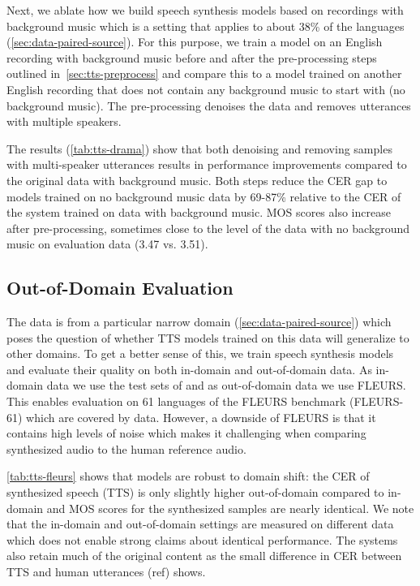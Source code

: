 Next, we ablate how we build speech synthesis models based on recordings with background music which is a setting that applies to about 38\% of the languages (\textsection\ref{sec:data-paired-source}).
For this purpose, we train a model on an English recording with background music before and after the pre-processing steps outlined in~\textsection\ref{sec:tts-preprocess} and compare this to a model trained on another English recording that does not contain any background music to start with (no background music).
The pre-processing denoises the data and removes utterances with multiple speakers.

The results (\autoref{tab:tts-drama}) show that both denoising and removing samples with multi-speaker utterances results in performance improvements compared to the original data with background music.
Both steps reduce the CER gap to models trained on no background music data by 69-87\% relative to the CER of the system trained on data with background music.
MOS scores also increase after pre-processing, sometimes close to the level of the data with no background music on \MMS{} evaluation data (3.47 vs. 3.51).



\subsection{Out-of-Domain Evaluation}
\label{sec:tts-results-fleurs}

The \MMS{} data is from a particular narrow domain (\textsection\ref{sec:data-paired-source}) which poses the question of whether TTS models trained on this data will generalize to other domains.
To get a better sense of this, we train speech synthesis models and evaluate their quality on both in-domain and out-of-domain data.
As in-domain data we use the test sets of \MMS{} and as out-of-domain data we use FLEURS. 
This enables evaluation on 61 languages of the FLEURS benchmark (FLEURS-61) which are covered by \MMS{} data. 
However, a downside of FLEURS is that it contains high levels of noise which makes it challenging when comparing synthesized audio to the human reference audio.

\insertTableResultsTTSFLEURS

\autoref{tab:tts-fleurs} shows that \modelname{} models are robust to domain shift:
the CER of synthesized speech (TTS) is only slightly higher out-of-domain compared to in-domain and MOS scores for the synthesized samples are nearly identical.
We note that the in-domain and out-of-domain settings are measured on different data which does not enable strong claims about identical performance.
The systems also retain much of the original content as the small difference in CER between TTS and human utterances (ref) shows.


